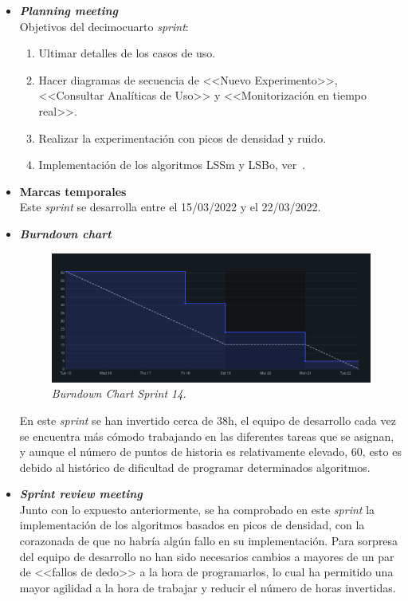 \begin{itemize}
\item \textbf{\textit{Planning meeting}}\\
Objetivos del decimocuarto \textit{sprint}:
\begin{enumerate}
\item Ultimar detalles de los casos de uso.
\item Hacer diagramas de secuencia de <<Nuevo Experimento>>, <<Consultar Analíticas de Uso>> y <<Monitorización en tiempo real>>.
\item Realizar la experimentación con picos de densidad y ruido.
\item Implementación de los algoritmos LSSm y LSBo, ver~\cite{leyva2015three}.
\end{enumerate}

\item \textbf{Marcas temporales}\\
Este \textit{sprint} se desarrolla entre el 15/03/2022 y el 22/03/2022.

\item \textbf{\textit{Burndown chart}}\\
\begin{figure}
\begin{center}
\includegraphics[width=\textwidth]{../img/anexos/sprints/BD-Sprint14}
\caption{\textit{Burndown Chart Sprint 14.}}\label{fig:BD-Sprint14}
\end{center}
\end{figure}
En este \textit{sprint} se han invertido cerca de 38h, el equipo de desarrollo cada vez se encuentra más cómodo trabajando en las diferentes tareas que se asignan, y aunque el número de puntos de historia es relativamente elevado, 60, esto es debido al histórico de dificultad de programar determinados algoritmos. 

\item \textbf{\textit{Sprint review meeting}}\\
Junto con lo expuesto anteriormente, se ha comprobado en este \textit{sprint} la implementación de los algoritmos basados en picos de densidad, con la corazonada de que no habría algún fallo en su implementación. Para sorpresa del equipo de desarrollo no han sido necesarios cambios a mayores de un par de <<fallos de dedo>> a la hora de programarlos, lo cual ha permitido una mayor agilidad a la hora de trabajar y reducir el número de horas invertidas.
\end{itemize}

